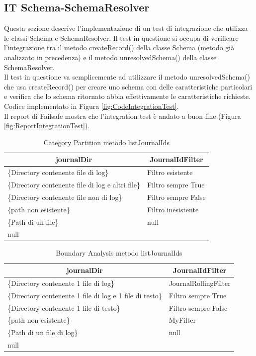 \documentclass[12pt, a4paper]{article}
\begin{document}
\subsection{IT Schema-SchemaResolver}
Questa sezione descrive l'implementazione di un test di integrazione che utilizza le classi Schema e SchemaResolver.
Il test in questione si occupa di verificare l'integrazione tra il metodo createRecord() della classe Schema (metodo già
analizzato in precedenza) e il metodo unresolvedSchema() della classe SchemaResolver. \\
Il test in questione va semplicemente ad utilizzare il metodo unresolvedSchema() che usa createRecord() per creare uno schema
con delle caratteristiche particolari e verifica che lo schema ritornato abbia effettivamente le caratteristiche richieste. \\
Codice implementato in Figura \ref{fig:CodeIntegrationTest}. \\
Il report di Failsafe mostra che l'integration test è andato a buon fine (Figura \ref{fig:ReportIntegrationTest}).
\newpage

\begin{table}[ht]
  \centering
  \caption[Journal: Category Partition]{Category Partition metodo listJournalIds}
  \begin{tabular}{|l|l|}
  \hline
  \multicolumn{1}{|c|}{journalDir} & \multicolumn{1}{|c|}{JournalIdFilter} \\
  \hline
  \{Directory contenente file di log\} & Filtro esistente \\
  \{Directory contenente file di log e altri file\} & Filtro sempre True \\
  \{Directory contenente file non di log\} & Filtro sempre False \\
  \{path non esistente\} & Filtro inesistente \\
  \{Path di un file\} & null \\
  null & \\
  \hline
  \end{tabular}
  \label{tab:categoryPartitionListJournalIds}
\end{table}

\begin{table}[ht]
  \centering
  \caption[Journal: Boundary Analysis]{Boundary Analysis metodo listJournalIds}
  \begin{tabular}{|l|l|}
  \hline
  \multicolumn{1}{|c|}{journalDir} & \multicolumn{1}{|c|}{JournalIdFilter} \\
  \hline
  \{Directory contenente 1 file di log\} & JournalRollingFilter \\
  \{Directory contenente 1 file di log e 1 file di testo\} & Filtro sempre True \\
  \{Directory contenente 1 file di testo\} & Filtro sempre False \\
  \{path non esistente\} & MyFilter \\
  \{Path di un file di log\} & null \\
  null & \\
  \hline
  \end{tabular}
  \label{tab:boundaryAnalyisListJournalIds}
\end{table}
\end{document}
